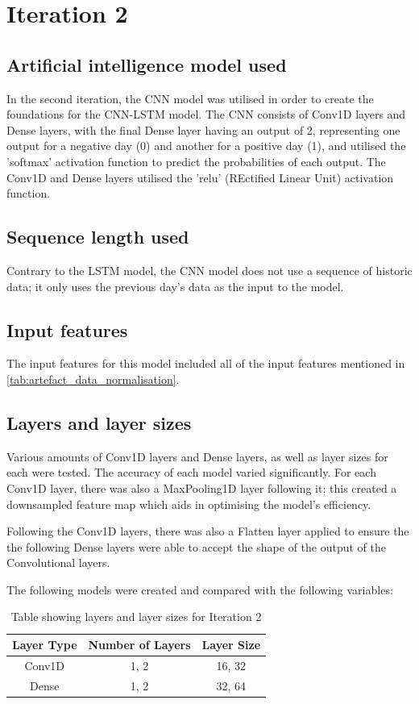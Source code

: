 \section{Iteration 2}
\subsection{Artificial intelligence model used}\label{ssec:iteration2_ai_model}
In the second iteration, the CNN model was utilised in order to create the foundations for the CNN-LSTM model. The CNN
consists of Conv1D layers and Dense layers, with the final Dense layer having an output of 2, representing one output for
a negative day (0) and another for a positive day (1), and utilised the 'softmax' activation function to predict the
probabilities of each output. The Conv1D and Dense layers utilised the 'relu' (REctified Linear Unit) activation
function.

\subsection{Sequence length used}
Contrary to the LSTM model, the CNN model does not use a sequence of historic data; it only uses the previous day's
data as the input to the model.

\subsection{Input features}
The input features for this model included all of the input features mentioned in \autoref{tab:artefact_data_normalisation}.

\subsection{Layers and layer sizes} \label{ssec:iteration2layers}
Various amounts of Conv1D layers and Dense layers, as well as layer sizes for each were tested. The accuracy of each model varied
significantly. For each Conv1D layer, there was also a MaxPooling1D layer following it; this created a downsampled
feature map which aids in optimising the model's efficiency.

Following the Conv1D layers, there was also a Flatten layer applied to ensure the the following Dense layers
were able to accept the shape of the output of the Convolutional layers.

The following models were created and compared with the following variables:

\begin{table}[ht]
    \centering
    \begin{tabular}{|c|c|c|}
        \hline
        Layer Type & Number of Layers & Layer Size \\
        \hline\hline
        Conv1D & 1, 2 & 16, 32 \\
        Dense & 1, 2 & 32, 64 \\
        \hline
    \end{tabular}
    \caption{Table showing layers and layer sizes for Iteration 2}
    \label{tab:iteration2_layers}
\end{table}
\FloatBarrier

